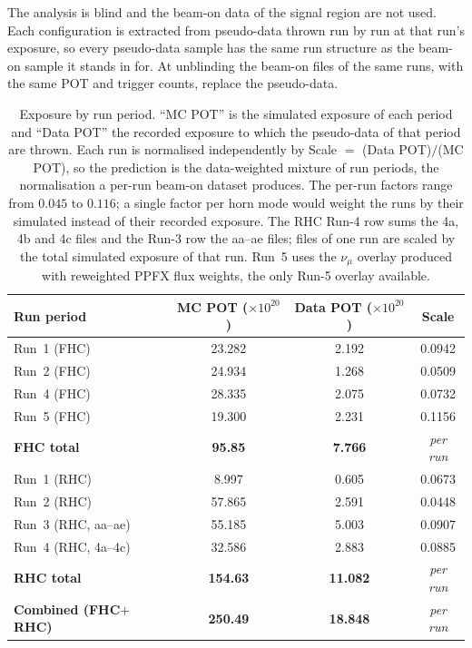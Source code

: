 \documentclass[11pt,a4paper]{article}
\begin{document}
The analysis is blind and the beam-on data of the signal region are not used. Each configuration
is extracted from pseudo-data thrown run by run at that run's exposure, so every pseudo-data sample
has the same run structure as the beam-on sample it stands in for. At unblinding the beam-on files
of the same runs, with the same POT and trigger counts, replace the pseudo-data.

\begin{table}[H]
  \centering
  \caption{Exposure by run period. ``MC POT'' is the simulated exposure of each period and ``Data
    POT'' the recorded exposure to which the pseudo-data of that period are thrown. Each run is
    normalised independently by Scale $=$ (Data POT)$/$(MC POT), so the prediction is the
    data-weighted mixture of run periods, the normalisation a per-run beam-on dataset produces. The
    per-run factors range from $0.045$ to $0.116$; a single factor per horn mode would weight the
    runs by their simulated instead of their recorded exposure. The RHC Run-4 row sums the 4a, 4b and
    4c files and the Run-3 row the aa--ae files; files of one run are scaled by the total simulated
    exposure of that run. Run~5 uses the $\nu_\mu$ overlay produced with reweighted PPFX flux
    weights, the only Run-5 overlay available.}
  \label{tab:pot}
  \begin{tabular}{lccc}
    \toprule
    Run period & MC POT ($\times10^{20}$) & Data POT ($\times10^{20}$) & Scale \\
    \midrule
    Run~1 (FHC)  & 23.282 &  2.192 & 0.0942 \\
    Run~2 (FHC)  & 24.934 &  1.268 & 0.0509 \\
    Run~4 (FHC)  & 28.335 &  2.075 & 0.0732 \\
    Run~5 (FHC)  & 19.300 &  2.231 & 0.1156 \\
    \textbf{FHC total} & \textbf{95.85} & \textbf{7.766} & \emph{per run} \\
    \midrule
    Run~1 (RHC)      &  8.997 & 0.605 & 0.0673 \\
    Run~2 (RHC)      & 57.865 & 2.591 & 0.0448 \\
    Run~3 (RHC, aa--ae) & 55.185 & 5.003 & 0.0907 \\
    Run~4 (RHC, 4a--4c) & 32.586 & 2.883 & 0.0885 \\
    \textbf{RHC total} & \textbf{154.63} & \textbf{11.082} & \emph{per run} \\
    \midrule
    \textbf{Combined (FHC$+$RHC)} & \textbf{250.49} & \textbf{18.848} & \emph{per run} \\
    \bottomrule
  \end{tabular}
\end{table}
\end{document}
